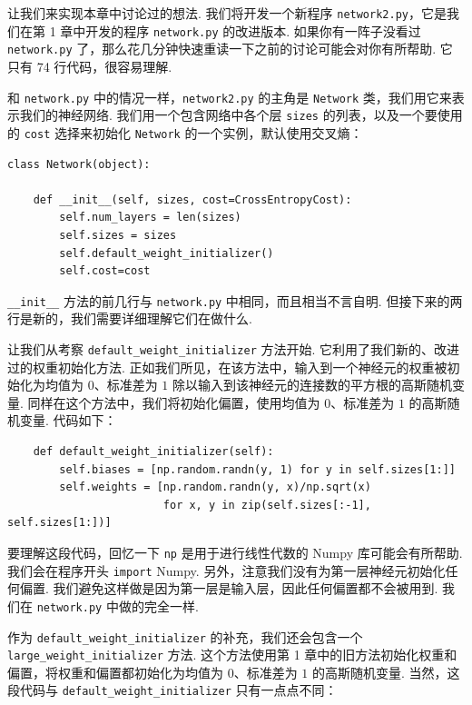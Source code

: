 让我们来实现本章中讨论过的想法. 我们将开发一个新程序 \texttt{network2.py}，它是我们在第 1 章中开发的程序 \texttt{network.py} 的改进版本. 如果你有一阵子没看过 \texttt{network.py} 了，那么花几分钟快速重读一下之前的讨论可能会对你有所帮助. 它只有 74 行代码，很容易理解.

和 \texttt{network.py} 中的情况一样，\texttt{network2.py} 的主角是 \texttt{Network} 类，我们用它来表示我们的神经网络. 我们用一个包含网络中各个层 \texttt{sizes} 的列表，以及一个要使用的 \texttt{cost} 选择来初始化 \texttt{Network} 的一个实例，默认使用交叉熵：

\begin{lstlisting}
class Network(object):

    def __init__(self, sizes, cost=CrossEntropyCost):
        self.num_layers = len(sizes)
        self.sizes = sizes
        self.default_weight_initializer()
        self.cost=cost

\end{lstlisting}

\texttt{\_\allowbreak{}\_\allowbreak{}init\_\allowbreak{}\_\allowbreak{}} 方法的前几行与 \texttt{network.py} 中相同，而且相当不言自明. 但接下来的两行是新的，我们需要详细理解它们在做什么.

让我们从考察 \texttt{default\_\allowbreak{}weight\_\allowbreak{}initializer} 方法开始. 它利用了我们新的、改进过的权重初始化方法. 正如我们所见，在该方法中，输入到一个神经元的权重被初始化为均值为 0、标准差为 $1$ 除以输入到该神经元的连接数的平方根的高斯随机变量. 同样在这个方法中，我们将初始化偏置，使用均值为 $0$、标准差为 $1$ 的高斯随机变量. 代码如下：

\begin{lstlisting}
    def default_weight_initializer(self):
        self.biases = [np.random.randn(y, 1) for y in self.sizes[1:]]
        self.weights = [np.random.randn(y, x)/np.sqrt(x)
                        for x, y in zip(self.sizes[:-1], self.sizes[1:])]

\end{lstlisting}

要理解这段代码，回忆一下 \texttt{np} 是用于进行线性代数的 Numpy 库可能会有所帮助. 我们会在程序开头 \texttt{import} Numpy. 另外，注意我们没有为第一层神经元初始化任何偏置. 我们避免这样做是因为第一层是输入层，因此任何偏置都不会被用到. 我们在 \texttt{network.py} 中做的完全一样.

作为 \texttt{default\_\allowbreak{}weight\_\allowbreak{}initializer} 的补充，我们还会包含一个 \texttt{large\_\allowbreak{}weight\_\allowbreak{}initializer} 方法. 这个方法使用第 1 章中的旧方法初始化权重和偏置，将权重和偏置都初始化为均值为 $0$、标准差为 $1$ 的高斯随机变量. 当然，这段代码与 \texttt{default\_\allowbreak{}weight\_\allowbreak{}initializer} 只有一点点不同：

